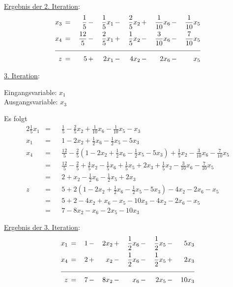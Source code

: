 \documentclass[10pt,a4paper,oneside,ngerman,numbers=noenddot]{scrartcl}
\begin{document}
	\underline{Ergebnis der 2. Iteration}:
	\begin{alignat*}{6}
		x_{3} \,&=&\, \frac{1}{5} \,&-&\, \frac{1}{5}x_{1} \,&-&\, \frac{2}{5}x_{2}  \,&+&\, \frac{1}{10}x_{6} \,&-&\, \frac{1}{10}x_{5} \\
		x_{4} \,&=&\, \frac{12}{5} \,&-&\, \frac{2}{5}x_{1} \,&+&\, \frac{1}{5}x_{2} \,&-&\, \frac{3}{10}x_{6} \,&-&\, \frac{7}{10}x_{5} \\ \cline{1 - 11}
		z \,&=&\, 5 \,&+&\, 2x_{1} \,&-&\, 4x_{2} \,&-&\, 2x_{6} \,&-&\, x_{5}
	\end{alignat*}
		
	\underline{3. Iteration}:
		
	Eingangsvariable: $x_{1}$\\
	Ausgangsvariable: $x_{3}$
		
	Es folgt
	\begin{alignat*}{2}
		\frac{1}{5}x_{1} &=&& \frac{1}{5} - \frac{2}{5}x_{2} + \frac{1}{10}x_{6} - \frac{1}{10}x_{5} - x_{3} \\
		x_{1} &=&& 1 - 2x_{2} + \frac{1}{2}x_{6} - \frac{1}{2}x_{5} - 5x_{3} \\
		x_{4} &=&& \frac{12}{5} - \frac{2}{5}\left(1 - 2x_{2} + \frac{1}{2}x_{6} - \frac{1}{2}x_{5} - 5x_{3}\right) + \frac{1}{5}x_{2} - \frac{3}{10}x_{6} - \frac{7}{10}x_{5} \\
		&=&& \frac{12}{5} - \frac{2}{5} + \frac{4}{5}x_{2} - \frac{1}{5}x_{6} + \frac{1}{5}x_{5} + 2x_{3} + \frac{1}{5}x_{2} - \frac{3}{10}x_{6} - \frac{7}{10}x_{5} \\
		&=&& 2 + x_{2} - \frac{1}{2}x_{6} - \frac{1}{2}x_{5} + 2x_{3} \\
		z &=&& 5 + 2\left(1 - 2x_{2} + \frac{1}{2}x_{6} - \frac{1}{2}x_{5} - 5x_{3}\right) - 4x_{2} - 2x_{6} - x_{5} \\
		&=&& 5 + 2 - 4x_{2} + x_{6} - x_{5} - 10x_{3} - 4x_{2} - 2x_{6} - x_{5} \\
		&=&& 7 - 8x_{2} - x_{6} - 2x_{5} - 10x_{3}
	\end{alignat*}
		
	\underline{Ergebnis der 3. Iteration}:
	\begin{alignat*}{6}
		x_{1} \,&=&\, 1 \,&-&\, 2x_{2} \,&+&\, \frac{1}{2}x_{6} \,&-&\, \frac{1}{2}x_{5} \,&-&\, 5x_{3} \\
		x_{4} \,&=&\, 2 \,&+&\, x_{2} \,&-&\, \frac{1}{2}x_{6} \,&-&\, \frac{1}{2}x_{5} \,&+&\, 2x_{3} \\ \cline{1 - 11}
		z \,&=&\, 7 \,&-&\, 8x_{2} \,&-&\, x_{6} \,&-&\, 2x_{5} \,&-&\, 10x_{3}
	\end{alignat*}
		
\end{document}
